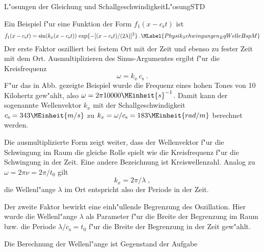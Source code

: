 \begin{MXContent}{L"osungen der Gleichung und Schallgeschwindigkeit}{L"osung}{STD}
\begin{MExample}
Ein Beispiel f"ur eine Funktion der Form $f_1(x-c_\mathrm{s}t)$ ist 
\begin{equation}
  f_1(x-c_\mathrm{s}t)=\sin(k_x(x-c_\mathrm{s}t))\,\exp\{-[(x-c_\mathrm{s}t)/(2\lambda)]^2\} \; . \MLabel{Physik_Schwingungen_EqWelleBspM}
\end{equation}
Der erste Faktor oszilliert  bei festem Ort mit der Zeit und ebenso zu fester Zeit mit dem Ort. Ausmultiplizieren des Sinus-Argumentes ergibt f"ur die Kreisfrequenz 
\begin{equation}
  \omega = k_x\, c_\mathrm{s}\;. 
\end{equation}
F"ur das in Abb.  gezeigte Beispiel wurde die Frequenz eines hohen Tones von 10 Kilohertz gew"ahlt, also $\omega = 2\pi 10000\MEinheit{s}^{-1}$. Damit kann der sogenannte Wellenvektor $k_x$ mit der Schallgeschwindigkeit $c_\mathrm{s}=343\MEinheit{m/s}$ zu $k_x=\omega/c_\mathrm{s}=183\MEinheit{rad/m}$ berechnet werden. 

\begin{center}
  \end{center}

Die ausmultiplizierte Form zeigt weiter, dass der Wellenvektor f"ur die Schwingung im Raum die gleiche Rolle spielt wie die Kreisfrequenz f"ur die Schwingung in der Zeit. Eine andere Bezeichnung ist Kreiswellenzahl. Analog zu $\omega = 2\pi \nu = 2\pi / t_0$ gilt 
\begin{equation}
  k_x = 2\pi / \lambda \; ,
\end{equation}
die Wellenl"ange $\lambda$ im Ort entspricht also der Periode in der Zeit. 

Der zweite Faktor bewirkt eine einh"ullende Begrenzung des Oszillation. Hier wurde die Wellenl"ange $\lambda$ als Parameter f"ur die Breite der Begrenzung im Raum bzw. die Periode $\lambda/c_\mathrm{s}=t_0$ f"ur die Breite der Begrenzung in der Zeit gew"ahlt. 

\end{MExample}

Die Berechnung der Wellenl"ange ist Gegenstand der Aufgabe 


\end{MXContent}

